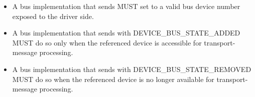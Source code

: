 \begin{itemize}
  \item A bus implementation that sends  MUST set
         to a valid bus device number exposed to the
        driver side.
  \item A bus implementation that sends  with
        DEVICE\_BUS\_STATE\_ADDED MUST do so only when the referenced device is
        accessible for transport-message processing.
  \item A bus implementation that sends  with
        DEVICE\_BUS\_STATE\_REMOVED MUST do so when the referenced device is no
        longer available for transport-message processing.
\end{itemize}
